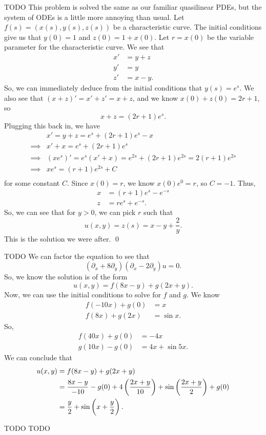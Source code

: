 \documentclass{article}
\renewcommand{\d}{\partial}
\begin{document}
\newpage
{} TODO \tri
\hop
\solution
This problem is solved the same as our familiar quasilinear PDEs, but the system of ODEs is a little more annoying than usual. Let $f(s) = (x(s), y(s),z(s))$ be a characteristic curve. The initial conditions give us that $y(0) = 1$ and $z(0) = 1 + x(0)$. Let $r = x(0)$ be the variable parameter for the characteristic curve. 
\hop 
We see that 
\begin{align*}
    x' &= y + z \\
    y' &= y\\
    z' &= x - y.
\end{align*}
So, we can immediately deduce from the initial conditions that $y(s) = e^s$. We also see that $(x+z)' = x'+z' = x+z$, and we know $x(0)+z(0) = 2r +1$, so \[x+z = (2r+1)e^s.\] 
Plugging this back in, we have 
\begin{align*}
    & x' = y+z = e^s+(2r+1)e^s - x \\ 
    \implies & x' + x = e^s + (2r+1)e^s \\
    \implies & (xe^{s})' = e^s(x' + x) = e^{2s} + (2r+1)e^{2s}= 2(r+1)e^{2s} \\
    \implies & xe^s = (r+1)e^{2s} + C\\
\end{align*}
for some constant $C$. Since $x(0) = r$, we know $x(0)e^0 = r$, so $C = -1$. Thus, 
\begin{align*}
    x &= (r+1)e^s - e^{-s}\\
    z &= re^s + e^{-s}.
\end{align*}
So, we can see that for $y > 0$, we can pick $r$ such that 
\[u(x,y) = z(s) = x - y + \frac{2}{y}.\]
This is the solution we were after. \qed


\newpage
{} TODO \tri
\hop
\solution
We can factor the equation to see that 
\[(\d_x+8\d_y)(\d_x-2\d_y)u = 0.\]
So, we know the solution is of the form 
\[u(x,y) = f(8x-y) + g(2x+y).\]
Now, we can use the initial conditions to solve for $f$ and $g$. We know 
\begin{align*}
    f(-10x)+g(0) &= x\\
    f(8x) + g(2x) &= \sin x.
\end{align*}
So, 
\begin{align*}
    f(40x) + g(0) &= -4x \\
    g(10x) - g(0) &= 4x + \sin 5x.
\end{align*}
We can conclude that 
\begin{align*}
    u(x,y) &= f(8x - y) + g(2x + y) \\
    &= \frac{8x-y}{-10} - g(0) + 4\del{\frac{2x+y}{10}} + \sin \del{\frac{2x+y}{2}} + g(0)\\
    &= \frac{y}{2} + \sin\del{x+ \frac{y}{2}}.
\end{align*}


\newpage
{} TODO \tri
\hop
\solution
TODO
\end{document}
